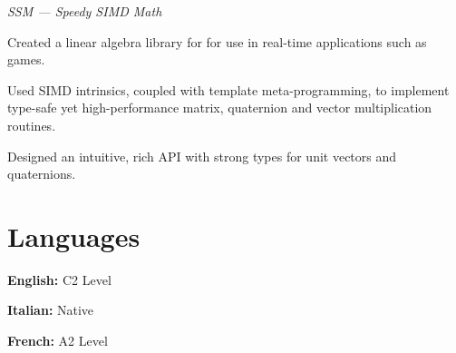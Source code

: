 \begin{cventries}
{\begin{cvitems}
    \end{cvitems}
  }
  {\textit{SSM --- Speedy SIMD Math}}
  {}
  {}
  {%
    \begin{cvitems}
    \item Created a linear algebra library for  for use in real-time applications such as games.\textbf{}
    \item Used SIMD intrinsics, coupled with template meta-programming, to implement type-safe yet high-performance matrix, quaternion and vector multiplication routines.
    \item Designed an intuitive, rich API with strong types for unit vectors and quaternions.
    \end{cvitems}
  }
\end{cventries}

\section*{Languages}
\begin{cvitems}
\item \textbf{English: } C2 Level
\item \textbf{Italian: } Native
\item \textbf{French: } A2 Level
\end{cvitems}
